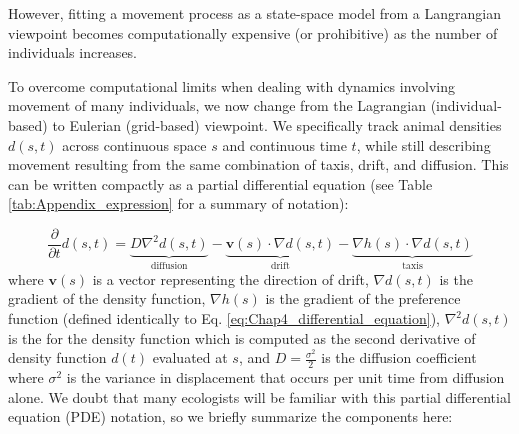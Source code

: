 However, fitting a movement process as a state-space model from a Langrangian viewpoint becomes computationally expensive (or prohibitive) as the number of individuals increases.  

To overcome computational limits when dealing with dynamics involving movement of many individuals, we now change from the Lagrangian (individual-based) to Eulerian (grid-based) viewpoint. We specifically track animal densities \(d(s,t)\) across continuous space \(s\) and continuous time \(t\), while still describing movement resulting from the same combination of taxis, drift, and diffusion.  This can be written compactly as a partial differential equation (see Table \ref{tab:Appendix_expression} for a summary of notation):  

\begin{equation} \label{eq:Chap10_PDE}
    \frac{\partial}{\partial t} d(s,t) = 
    \underbrace{D \nabla^2 d(s,t)}_{\mathrm{diffusion}}
    - \underbrace{\mathbf{v}(s) \cdot \nabla d(s,t)}_{\mathrm{drift}} 
    - \underbrace{\nabla h(s) \cdot \nabla d(s,t)}_{\mathrm{taxis}}   
\end{equation}
where \(\mathbf{v}(s)\) is a vector representing the direction of drift, \(\nabla d(s,t)\) is the gradient of the density function, \(\nabla h(s)\) is the gradient of the preference function (defined identically to Eq. \ref{eq:Chap4_differential_equation}), \( \nabla^2 d(s,t) \) is the  for the density function which is computed as the second derivative of density function \(d(t)\) evaluated at \(s\), and \(D = \frac{\sigma^2}{2}\) is the diffusion coefficient where \(\sigma^2\) is the variance in displacement that occurs per unit time from diffusion alone.  We doubt that many ecologists will be familiar with this partial differential equation (PDE) notation, so we briefly summarize the components here:

